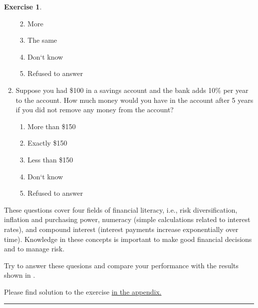 \documentclass[
  12pt,
  oneside]{book}
\providecommand{\tightlist}{%
  \setlength{\itemsep}{0pt}\setlength{\parskip}{0pt}}
\theoremstyle{definition}
\theoremstyle{definition}
\theoremstyle{definition}
\newtheorem{exercise}{Exercise}[chapter]
\theoremstyle{definition}
\theoremstyle{remark}
\begin{document}
\begin{exercise}
\begin{enumerate}
  \begin{enumerate}
  \def\labelenumii{\alph{enumii})}
  \tightlist
  \item
    More
  \item
    The same
  \item
    Don`t know
  \item
    Refused to answer
  \end{enumerate}
\item
  Suppose you had \$100 in a savings account and the bank adds 10\% per year to the account. How much money would you have in the account after 5 years if you did not remove any money from the account?

  \begin{enumerate}
  \def\labelenumii{\alph{enumii})}
  \tightlist
  \item
    More than \$150
  \item
    Exactly \$150
  \item
    Less than \$150
  \item
    Don`t know
  \item
    Refused to answer
  \end{enumerate}
\end{enumerate}

These questions cover four fields of financial literacy, i.e., risk diversification, inflation and purchasing power, numeracy (simple calculations related to interest rates), and compound interest (interest payments increase exponentially over time). Knowledge in these concepts is important to make good financial decisions and to manage risk.

Try to answer these quesions and compare your performance with the results shown in \citet{Klapper2020Financial}.

Please find solution to the exercise \hyperref[sol:flmeasure]{in the appendix.}

\begin{center}\rule{0.5\linewidth}{0.5pt}\end{center}

\end{exercise}
\end{document}
